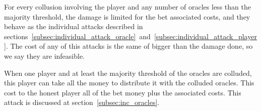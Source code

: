 For every collusion involving the player and any number of oracles less than
  the majority threshold, the damage is limited for the bet associated costs,
  and they behave as the individual attacks described in
  sections~\ref{subsec:individual_attack_oracle}~and~\ref{subsec:individual_attack_player}.
The cost of any of this attacks is the same of bigger than the damage done,
  so we say they are infeasible.

When one player and at least the majority threshold of the oracles are colluded,
  this player can take all the money to distribute it with the colluded oracles.
This cost to the honest player all of the bet money plus the associated costs.
This attack is discussed at section~\ref{subsec:inc_oracles}.
